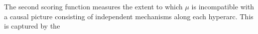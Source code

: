 The second scoring function measures
the extent to which
$\mu$ 
is incompatible with 
a causal picture consisting of independent mechanisms 
along each hyperarc. 
This is captured by the
